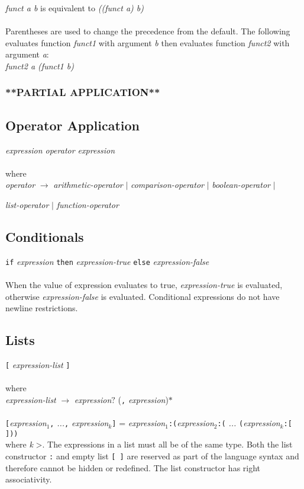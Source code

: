     \emph{funct a b}  is equivalent to \emph{((funct a) b)} \\ \\
    Parentheses are used to change the precedence from the default. The following evaluates function \emph{funct1} with argument \emph{b} then 
    evaluates function \emph{funct2} with argument \emph{a}: \\
    
    \emph{funct2 a (funct1 b)}

  \subsubsection{**PARTIAL APPLICATION**}
  

\subsection{Operator Application}
    \emph{expression  operator  expression}\\ \\
    where\\
    
    \emph{operator} $\rightarrow$ \emph{arithmetic-operator} $ | $  \emph{comparison-operator} $ | $ \emph{boolean-operator} $ | $ 
    
    \emph{list-operator} $ | $ \emph{function-operator}
    
\subsection{Conditionals}
  \texttt{if}  \emph{expression}  \texttt{then}  \emph{expression-true}  \texttt{else}  \emph{expression-false} \\ \\
  When the value of expression evaluates to true,  \emph{expression-true} is evaluated, otherwise  \emph{expression-false} is evaluated. Conditional expressions do not have newline restrictions.

\subsection{Lists}
  \texttt{[} \emph{expression-list} \texttt{]} \\ \\
  where \\
  
  \emph{expression-list} $\rightarrow$  \emph{expression}$?$ (\texttt{,} \emph{expression})$*$ \\ \\
\texttt{[}\emph{expression$_{1}$}\texttt{,} \emph{...}\texttt{,} \emph{expression$_{k}$}\texttt{]} = 
  \emph{expression$_{1}$}\texttt{:(}\emph{expression$_{2}$}\texttt{:(} \emph{...} \texttt{(}\emph{expression$_{k}$}\texttt{:[ ]))} \\ 
where \textit{k} \textgreater{}. The expressions in a list must all be of the same type. Both the list constructor \texttt{:} and empty list \texttt{[ ]} are reserved as part of the language syntax and therefore cannot be hidden or redefined. The list constructor has right associativity.

